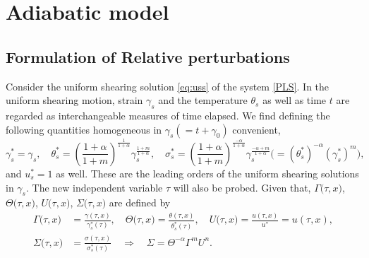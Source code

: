 \documentclass[a4paper,11pt]{article}
\theoremstyle{remark}
\begin{document}
{\section{Adiabatic model}
\subsection{Formulation of Relative perturbations}
Consider the uniform shearing solution \eqref{eq:uss} of the system \eqref{PLS}. In the uniform shearing motion, strain $\gamma_s$ and the temperature $\theta_s$ as well as time $t$ are regarded as interchangeable measures of time elapsed. We find defining the following quantities homogeneous in $\gamma_s(=t+\gamma_0)$ convenient,
$$ \gamma_s^* = \gamma_s, \quad \theta_s^*=\left( \frac{1+\alpha}{1+m}\right)^{\frac{1}{1+\alpha}} \gamma_s^{\frac{1+m}{1+\alpha}}, \quad \sigma^*_s = \left( \frac{1+\alpha}{1+m}\right)^{\frac{-\alpha}{1+\alpha}}\gamma_s^{\frac{-\alpha+m}{1+\alpha}} \Big( = (\theta_s^*)^{-\alpha}(\gamma_s^*)^m\Big),$$
and $u^*_s=1$ as well.
These are the leading orders of the uniform shearing solutions in $\gamma_s$. The new independent variable $\tau$ will also be probed. Given that, $\Gamma\big(\tau,x\big)$, $\Theta\big(\tau,x\big)$, $U\big(\tau,x\big)$, $\Sigma\big(\tau,x\big)$ are defined by %
\begin{equation*}
 \begin{aligned}
  \Gamma\big(\tau,x\big)&=\frac{\gamma(\tau,x)}{\gamma^*_s(\tau)}, \quad \Theta\big(\tau,x\big)=\frac{\theta(\tau,x)}{\theta^*_s(\tau)}, \quad U\big(\tau,x\big)=\frac{u(\tau,x)}{u^*}=u(\tau,x),\\
  \Sigma\big(\tau,x\big)&=\frac{\sigma(\tau,x)}{\sigma^*_s(\tau)} \quad \Longrightarrow \quad \Sigma = \Theta^{-\alpha}\Gamma^m U^n.
 \end{aligned}
\end{equation*}

}
\end{document}
